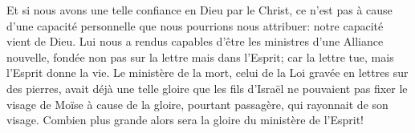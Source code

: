 Et si nous avons une telle confiance en Dieu par le Christ,
	ce n’est pas à cause d’une capacité personnelle
		que nous pourrions nous attribuer:
	notre capacité vient de Dieu.
Lui nous a rendus capables d’être les ministres d’une Alliance nouvelle,
	fondée non pas sur la lettre mais dans l’Esprit;
	car la lettre tue, mais l’Esprit donne la vie.
Le ministère de la mort, celui de la Loi gravée en lettres sur des pierres,
	avait déjà une telle gloire
	que les fils d’Israël ne pouvaient pas fixer le visage de Moïse
	à cause de la gloire, pourtant passagère, qui rayonnait de son visage.
Combien plus grande alors sera la gloire du ministère de l’Esprit!
